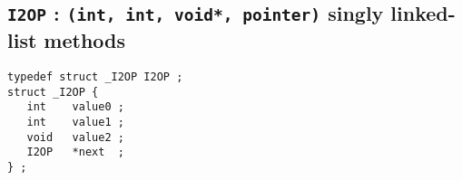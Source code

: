 \par
\subsection{{\tt I2OP} : 
           {\tt (int, int, void*, pointer)} singly linked-list methods}
\label{subsection:Utilities:proto:I2OP}
\par
\hspace{0.5 in}
\begin{minipage}{2.5 in}
\begin{verbatim}
typedef struct _I2OP I2OP ;
struct _I2OP {
   int    value0 ;
   int    value1 ;
   void   value2 ;
   I2OP   *next  ;
} ;
\end{verbatim}
\end{minipage}

\par

